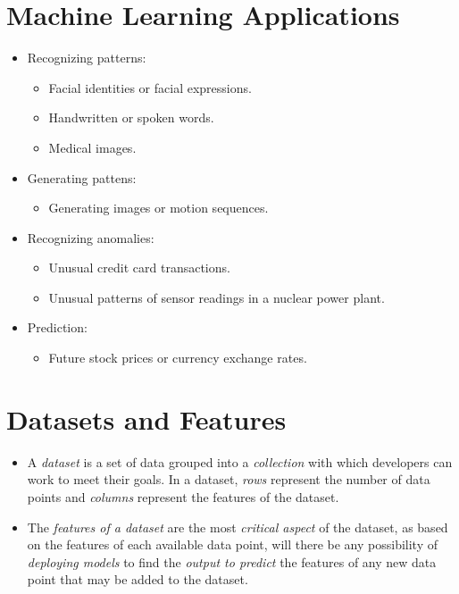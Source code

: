 \documentclass[
	number={1},
	title={Machine Learning Fundamentals}
]{cs584notes}
\begin{document}
\section{Machine Learning Applications}\label{sec:machine-learning-applications}
\begin{itemize}
	\item Recognizing patterns:
	\begin{itemize}
		\item Facial identities or facial expressions.
		\item Handwritten or spoken words.
		\item Medical images.
	\end{itemize}
	\item Generating pattens:
	\begin{itemize}
		\item Generating images or motion sequences.
	\end{itemize}
	\item Recognizing anomalies:
	\begin{itemize}
		\item Unusual credit card transactions.
		\item Unusual patterns of sensor readings in a nuclear power plant.
	\end{itemize}
	\item Prediction:
	\begin{itemize}
		\item Future stock prices or currency exchange rates.
	\end{itemize}
\end{itemize}

\section{Datasets and Features}\label{sec:datasets-and-features}
\begin{itemize}
	\item A \emph{dataset} is a set of data grouped into a \emph{collection} with which developers can work to meet their goals.
	In a dataset, \emph{rows} represent the number of data points and \emph{columns} represent the features of the dataset.
	\item The \emph{features of a dataset} are the most \emph{critical aspect} of the dataset, as based on the features of each available data point, will there be any possibility of \emph{deploying models} to find the \emph{output to predict} the features of any new data point that may be added to the dataset.
\end{itemize}
\end{document}

